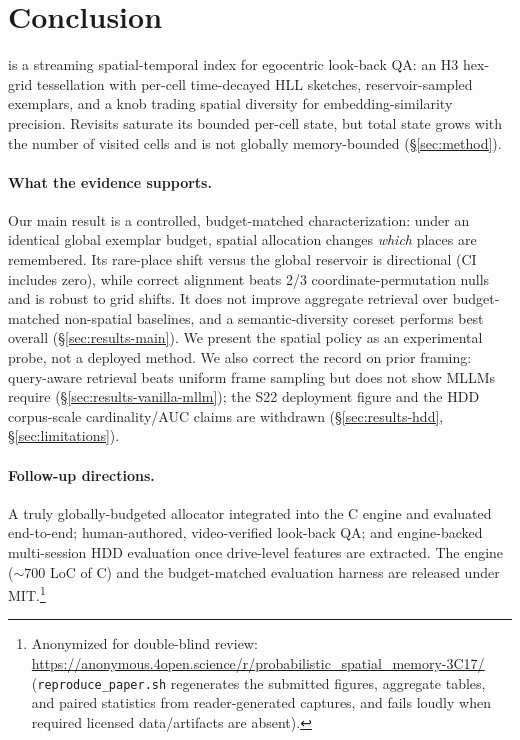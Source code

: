 
\section{Conclusion}
\label{sec:conclusion}

\psm is a streaming spatial-temporal index for egocentric look-back QA: an H3
hex-grid tessellation with per-cell time-decayed HLL sketches, reservoir-sampled
exemplars, and a \caponek{} knob trading spatial diversity for
embedding-similarity precision. Revisits saturate its bounded per-cell state, but
total state grows with the number of visited cells and is not globally
memory-bounded (\S\ref{sec:method}).

\paragraph{What the evidence supports.}
Our main result is a controlled, budget-matched characterization: under an
identical global exemplar budget, spatial allocation changes \emph{which} places
are remembered. Its rare-place shift versus the global reservoir is directional
(CI includes zero), while correct alignment beats 2/3 coordinate-permutation
nulls and is robust to grid shifts. It does not
improve aggregate retrieval over budget-matched non-spatial baselines, and a
semantic-diversity coreset performs best overall (\S\ref{sec:results-main}). We
present the spatial policy as an experimental probe, not a deployed method. We
also correct the record on prior framing: query-aware retrieval beats uniform
frame sampling but does not show MLLMs require \psm{}
(\S\ref{sec:results-vanilla-mllm}); the S22 deployment figure and the HDD
corpus-scale cardinality/AUC claims are withdrawn (\S\ref{sec:results-hdd},
\S\ref{sec:limitations}).

\paragraph{Follow-up directions.}
A truly globally-budgeted allocator integrated into the C engine and evaluated
end-to-end; human-authored, video-verified look-back QA; and engine-backed
multi-session HDD evaluation once drive-level features are extracted. The engine
(${\sim}700$ LoC of C) and the budget-matched evaluation harness are released
under MIT.\footnote{Anonymized for double-blind review:
\url{https://anonymous.4open.science/r/probabilistic_spatial_memory-3C17/}
(\texttt{reproduce\_paper.sh} regenerates the submitted figures, aggregate
tables, and paired statistics from reader-generated captures, and fails loudly
when required licensed data/artifacts are absent).}
